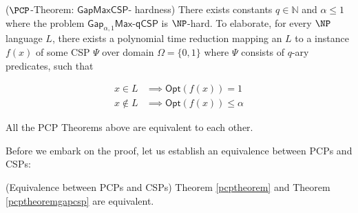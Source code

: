 \begin{theorem} \label{pcptheoremgapcsp}  ($\PCP$-Theorem: $\mathsf{GapMaxCSP}$- hardness) There exists constants $q \in \mathbb{N}$ and $\alpha \leq 1$ where the problem $\mathsf{Gap}_{\alpha,1}\mathsf{Max}$-$\mathsf{qCSP}$ is $\NP$-hard. To elaborate, for every $\NP$ language $L$, there exists a polynomial time reduction mapping an $L$ to a instance $f(x)$ of some CSP $\Psi$ over domain $\Omega=\{0,1\}$ where $\Psi$ consists of $q$-ary predicates, such that

\begin{align*}
  x \in L & \implies \mathsf{Opt}(f(x)) = 1 \\
  x \not\in L & \implies \mathsf{Opt}(f(x)) \leq \alpha
\end{align*}
\end{theorem}

\begin{theorem}
  All the PCP Theorems above are equivalent to each other.
\end{theorem}

Before we embark on the proof, let us establish an equivalence between PCPs and CSPs:

\begin{lemma} (Equivalence between PCPs and CSPs)
  Theorem \ref{pcptheorem} and  Theorem \ref{pcptheoremgapcsp} are equivalent.
\end{lemma}

